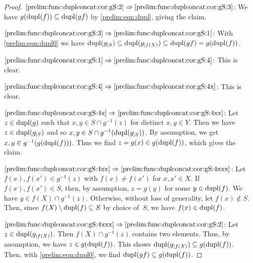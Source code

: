 \begin{proof}
$\ref{prelim:func:duplconcat:cor:gS:2} \Rightarrow \ref{prelim:func:duplconcat:cor:gS:3}$: 
We have $g(\dupl{f}) \subseteq \dupl{\concat{f}{g}}$ by \cref{prelim:eqn:dupl}, giving the claim.

$\ref{prelim:func:duplconcat:cor:gS:3} \Rightarrow \ref{prelim:func:duplconcat:cor:gS:1}$:
With \cref{prelim:eqn:dupl0} we have $\dupl{g_{|S}} \subseteq \dupl{g_{|f(X)}} \subseteq \dupl{\concat{f}{g}} = g(\dupl{f})$. 

$\ref{prelim:func:duplconcat:cor:gS:1} \Rightarrow \ref{prelim:func:duplconcat:cor:gS:4}$: This is clear.

$\ref{prelim:func:duplconcat:cor:gS:4} \Rightarrow \ref{prelim:func:duplconcat:cor:gS:4x}$: This is clear.
	
$\ref{prelim:func:duplconcat:cor:gS:4x} \Rightarrow \ref{prelim:func:duplconcat:cor:gS:4xx}$:
Let $z \in \dupl{g}$ such that $x,y \in S \cap g^{-1}(z)$ for distinct $x,y \in Y$.
Then we have $z \in \dupl{g_{|S}}$ and so $x,y \in S \cap g^{-1}(\dupl{g_{|S}})$.
By assumption, we get $x,y \in g^{-1}(g(\dupl{f}))$.
Thus we find $z = g(x) \in g(\dupl{f})$, which gives the claim.

$\ref{prelim:func:duplconcat:cor:gS:4xx} \Rightarrow \ref{prelim:func:duplconcat:cor:gS:4xxx}$:
Let $f(x), f(x') \in g^{-1}(z)$ with $f(x) \ne f(x')$ for $x,x' \in X$.
If $f(x), f(x') \in S$, then, by assumption, $z = g(y)$ for some $y \in \dupl{f}$.
We have $y \in f(X) \cap g^{-1}(z)$.
Otherwise, without loss of generality, let $f(x) \notin S$.
Then, since $f(X) \setminus \dupl{f} \subseteq S$ by choice of~$S$,
we have $f(x) \in \dupl{f}$.

$\ref{prelim:func:duplconcat:cor:gS:4xxx} \Rightarrow \ref{prelim:func:duplconcat:cor:gS:2}$:
Let $z \in \dupl{g_{|f(X)}}$.
Then $f(X) \cap g^{-1}(z)$ contains two elements.
Thus, by assumption, we have $z \in g(\dupl{f})$.
This shows $\dupl{g_{|f(X)}} \subseteq g(\dupl{f})$.
Then, with \cref{prelim:eqn:dupl0}, we find 
$\dupl{\concat{f}{g}} \subseteq g(\dupl{f})$.
\end{proof}


